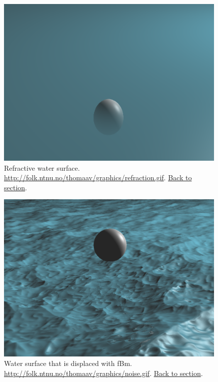 \documentclass[abstract=off,oneside]{scrreprt}
\begin{document}
\begin{figure}[htb]
\centering
\includegraphics[width=0.99\textwidth]{./img/refraction.png}
\caption*{\label{fig:refraction}Refractive water surface. \url{http://folk.ntnu.no/thomaav/graphics/refraction.gif}. \hyperref[sec:water]{Back to section}.}
\end{figure}

\begin{figure}[htb]
\centering
\includegraphics[width=0.99\textwidth]{./img/noise.png}
\caption*{\label{fig:noise}Water surface that is displaced with fBm. \url{http://folk.ntnu.no/thomaav/graphics/noise.gif}. \hyperref[sec:realisticwaves]{Back to section}.}
\end{figure}
\end{document}
